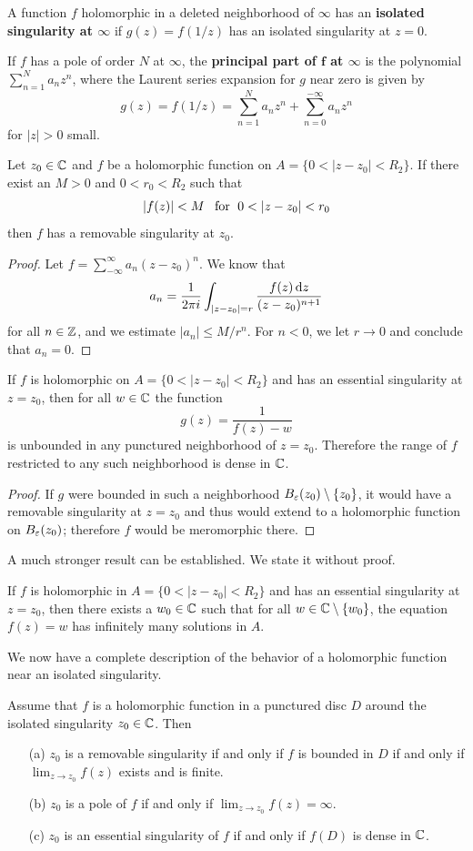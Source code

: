 \begin{definition}
A function $f$ holomorphic in a deleted neighborhood of $\infty$ has an \textbf{isolated singularity at $\infty$} if $g(z)=f(1/z)$ has an isolated singularity at $z=0$.\par
If $f$ has a pole of order $N$ at $\infty$, the \textbf{principal part of $\bm{f}$ at $\infty$} is the polynomial $\sum_{n=1}^{N}a_nz^n$, where the Laurent series expansion for $g$ near zero is given by
\[g(z)=f(1/z)=\sum_{n=1}^{N}a_nz^n+\sum_{n=0}^{-\infty}a_nz^n\]
for $|z|>0$ small.
\end{definition}
\begin{theorem}
Let $z_0\in\mathbb{C}$ and $f$ be a holomorphic function on $A=\{0<|z-z_0|<R_2\}$. If there exist an $M>0$ and $0<r_0<R_2$ such that
\[|f(z)|<M\for 0<|z-z_0|<r_0\]
then $f$ has a removable singularity at $z_0$.
\end{theorem}
\begin{proof}
Let $f=\sum_{-\infty}^{\infty}a_n(z-z_0)^n$. We know that
\[a_n=\frac{1}{2\pi i}\int_{|z-z_0|=r}\frac{f(z)\mathop{}\!\mathrm{d} z}{(z-z_0)^{n+1}}\]
for all $n\in\mathbb{Z}$, and we estimate $|a_n|\leq M/r^n$. For $n<0$, we let $r\to 0$ and conclude that $a_n=0$.
\end{proof}
\begin{theorem}
If $f$ is holomorphic on $A=\{0<|z-z_0|<R_2\}$ and has an essential singularity at $z=z_0$, then for all $w\in\mathbb{C}$ the function
\[g(z)=\frac{1}{f(z)-w}\]
is unbounded in any punctured neighborhood of $z=z_0$. Therefore the range of $f$ restricted to any such neighborhood is dense in $\mathbb{C}$.
\end{theorem}
\begin{proof}
If $g$ were bounded in such a neighborhood $B_\varepsilon(z_0)\setminus\{z_0\}$, it would have a removable singularity at $z=z_0$ and thus would extend to a holomorphic function on $B_{\varepsilon}(z_0)$; therefore $f$ would be meromorphic there.
\end{proof}
A much stronger result can be established. We state it without proof.
\begin{theorem}
If $f$ is holomorphic in $A=\{0<|z-z_0|<R_2\}$ and has an essential singularity at $z=z_0$, then there exists a $w_0\in\mathbb{C}$ such that for all $w\in\mathbb{C}\setminus\{w_0\}$, the equation $f(z)=w$ has infinitely many solutions in $A$.
\end{theorem}
We now have a complete description of the behavior of a holomorphic function
near an isolated singularity.
\begin{theorem}
Assume that $f$ is a holomorphic function in a punctured disc $D$ around the isolated singularity $z_0\in\mathbb{C}$. Then
\begin{itemize}
\item[(a)] $z_0$ is a removable singularity if and only if $f$ is bounded in $D$ if and only if $\lim_{z\to z_0}f(z)$ exists and is finite.
\item[(b)] $z_0$ is a pole of $f$ if and only if $\lim_{z\to z_0}f(z)=\infty$.
\item[(c)] $z_0$ is an essential singularity of $f$ if and only if $f(D)$ is dense in $\mathbb{C}$.
\end{itemize}
\end{theorem}
